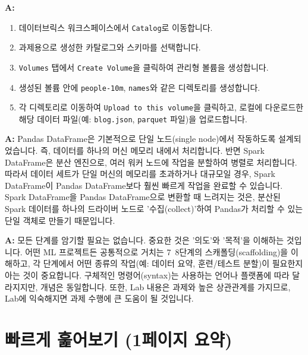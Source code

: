 \documentclass[11pt,a4paper]{article}
\theoremstyle{definition}
\newcommand{\code}[1]{\texttt{#1}}
\begin{document}
\begin{tcolorbox}[summary, title=Q: 데이터브릭스 볼륨에 데이터를 업로드하는 구체적인 절차는 무엇인가요?]
\textbf{A:}
\begin{enumerate}
    \item 데이터브릭스 워크스페이스에서 \code{Catalog}로 이동합니다.
    \item 과제용으로 생성한 카탈로그와 스키마를 선택합니다.
    \item \code{Volumes} 탭에서 \code{Create Volume}을 클릭하여 관리형 볼륨을 생성합니다.
    \item 생성된 볼륨 안에 \code{people-10m}, \code{names}와 같은 디렉토리를 생성합니다.
    \item 각 디렉토리로 이동하여 \code{Upload to this volume}을 클릭하고, 로컬에 다운로드한 해당 데이터 파일(예: \code{blog.json}, \code{parquet} 파일)을 업로드합니다.
\end{enumerate}
\end{tcolorbox}

\begin{tcolorbox}[summary, title=Q: Pandas DataFrame이 Spark DataFrame보다 느린 이유는 무엇인가요?]
\textbf{A:} Pandas DataFrame은 기본적으로 단일 노드(single node)에서 작동하도록 설계되었습니다. 즉, 데이터를 하나의 머신 메모리 내에서 처리합니다. 반면 Spark DataFrame은 분산 엔진으로, 여러 워커 노드에 작업을 분할하여 병렬로 처리합니다. 따라서 데이터 세트가 단일 머신의 메모리를 초과하거나 대규모일 경우, Spark DataFrame이 Pandas DataFrame보다 훨씬 빠르게 작업을 완료할 수 있습니다. Spark DataFrame을 Pandas DataFrame으로 변환할 때 느려지는 것은, 분산된 Spark 데이터를 하나의 드라이버 노드로 '수집(collect)'하여 Pandas가 처리할 수 있는 단일 객체로 만들기 때문입니다.
\end{tcolorbox}

\begin{tcolorbox}[summary, title=Q: Lab 노트북을 어떻게 공부해야 하나요? 모든 단계를 암기해야 하나요?]
\textbf{A:} 모든 단계를 암기할 필요는 없습니다. 중요한 것은 '의도'와 '목적'을 이해하는 것입니다. 어떤 ML 프로젝트든 공통적으로 거치는 7~8단계의 스캐폴딩(scaffolding)을 이해하고, 각 단계에서 어떤 종류의 작업(예: 데이터 요약, 훈련/테스트 분할)이 필요한지 아는 것이 중요합니다. 구체적인 명령어(syntax)는 사용하는 언어나 플랫폼에 따라 달라지지만, 개념은 동일합니다. 또한, Lab 내용은 과제와 높은 상관관계를 가지므로, Lab에 익숙해지면 과제 수행에 큰 도움이 될 것입니다.
\end{tcolorbox}

\newpage
\section{빠르게 훑어보기 (1페이지 요약)}
\end{document}
